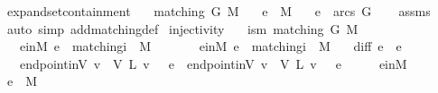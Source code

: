 \begin{isabellebody}
\endisatagproof
{\isafoldproof}%
%
\isadelimproof
\isanewline
%
\endisadelimproof
\isanewline
{}\isamarkupfalse%
\ expand{\isacharunderscore}set{\isacharunderscore}containment{\isacharcolon}\isanewline
\ \ \ {\isachardoublequoteopen}matching\ G\ M{\isachardoublequoteclose}\isanewline
\ \ \ {\isachardoublequoteopen}e\ {\isasymin}\ M{\isachardoublequoteclose}\isanewline
\ \ \ {\isachardoublequoteopen}e\ {\isasymin}\ arcs\ G{\isachardoublequoteclose}\isanewline
%
\isadelimproof
\ \ %
\endisadelimproof
%
\isatagproof
{}\isamarkupfalse%
\ assms\isanewline
\ \ \isamarkupfalse%
\ {\isacharparenleft}auto\ simp\ add{\isacharcolon}matching{\isacharunderscore}def{\isacharparenright}%
\endisatagproof
{\isafoldproof}%
%
\isadelimproof
\isanewline
%
\endisadelimproof
\isanewline
{}\isamarkupfalse%
\ injectivity{\isacharcolon}\isanewline
\ \ \ is{\isacharunderscore}m{\isacharcolon}\ {\isachardoublequoteopen}matching\ G\ M{\isachardoublequoteclose}\isanewline
\ \ \ e{}{\isacharunderscore}in{\isacharunderscore}M{}{\isacharcolon}\ {\isachardoublequoteopen}e{}\ {\isasymin}\ matching{\isacharunderscore}i\ {}\ M{\isachardoublequoteclose}\isanewline
\ \ \ \ \ \ \ e{}{\isacharunderscore}in{\isacharunderscore}M{}{\isacharcolon}\ {\isachardoublequoteopen}e{}\ {\isasymin}\ matching{\isacharunderscore}i\ {}\ M{\isachardoublequoteclose}\isanewline
\ \ \ diff{\isacharcolon}\ {\isachardoublequoteopen}{\isacharparenleft}e{}\ {\isasymnoteq}\ e{}{\isacharparenright}{\isachardoublequoteclose}\isanewline
\ \ \ {\isachardoublequoteopen}endpoint{\isacharunderscore}inV\ {\isacharbraceleft}v\ {\isasymin}\ V{\isachardot}\ L\ v\ {\isacharequal}\ {}{\isacharbraceright}\ e{}\ {\isasymnoteq}\ endpoint{\isacharunderscore}inV\ {\isacharbraceleft}v\ {\isasymin}\ V{\isachardot}\ L\ v\ {\isacharequal}\ {}{\isacharbraceright}\ e{}{\isachardoublequoteclose}\isanewline
%
\isadelimproof
%
\endisadelimproof
%
\isatagproof
{}\isamarkupfalse%
\ {\isacharminus}\isanewline
\ \ \isamarkupfalse%
\ e{}{\isacharunderscore}in{\isacharunderscore}M{}\ \isamarkupfalse%
\ {\isachardoublequoteopen}e{}\ {\isasymin}\ M{\isachardoublequoteclose}\ \isamarkupfalse%

\end{isabellebody}
